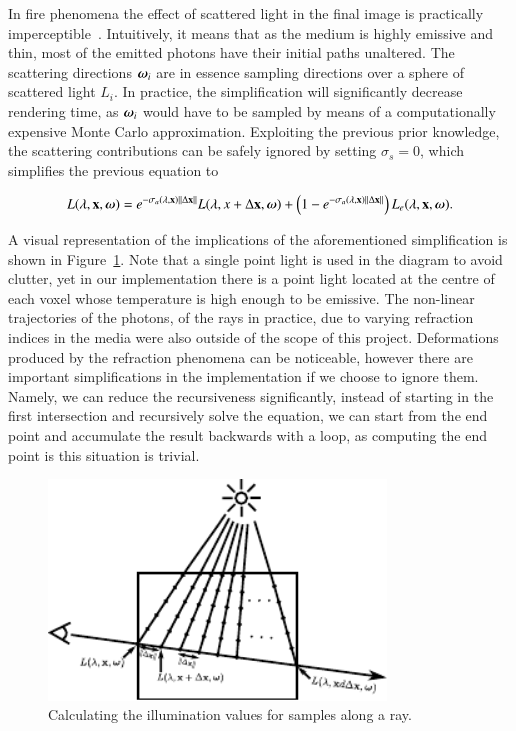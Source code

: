 In fire phenomena the effect of scattered light in the final image is practically imperceptible~\cite{Pegoraro:2006}.
Intuitively, it means that as the medium is highly emissive and thin, most of the emitted photons have their initial paths unaltered.
The scattering directions $\boldsymbol{\omega}_i$ are in essence sampling directions over a sphere of scattered light $L_i$.
In practice, the simplification will significantly decrease rendering time, as $\boldsymbol{\omega}_i$ would have to be sampled by means of a computationally expensive Monte Carlo approximation. 
Exploiting the previous prior knowledge, the scattering contributions can be safely ignored by setting $\sigma_s = 0$, which simplifies the previous equation to

\begin{equation}
L(\lambda, \mathbf{x}, \boldsymbol{\omega}) = e^{-\sigma_a(\lambda, \mathbf{x}) \left \| \Delta \mathbf{x} \right \|} L(\lambda, x + \Delta\mathbf{x}, \boldsymbol{\omega}) +  \left(1 - e^{-\sigma_a(\lambda, \mathbf{x}) \left \| \Delta \mathbf{x} \right \|} \right) L_e(\lambda, \mathbf{x}, \boldsymbol{\omega}).
\end{equation}

A visual representation of the implications of the aforementioned simplification is shown in Figure~\ref{fig:ray_marching}.
Note that a single point light is used in the diagram to avoid clutter, yet in our implementation there is a point light located at the centre of each voxel whose temperature is high enough to be emissive.
The non-linear trajectories of the photons, of the rays in practice, due to varying refraction indices in the media were also outside of the scope of this project.
Deformations produced by the refraction phenomena can be noticeable, however there are important simplifications in the implementation if we choose to ignore them.
Namely, we can reduce the recursiveness significantly, instead of starting in the first intersection and recursively solve the equation, we can start from the end point and accumulate the result backwards with a loop, as computing the end point is this situation is trivial.

\begin{figure}[htbp!]
	\centering
	\includegraphics[width=0.8\textwidth]{img/ray_marching}
	\caption{Calculating the illumination values for samples along a ray.}
	\label{fig:ray_marching}
\end{figure}


